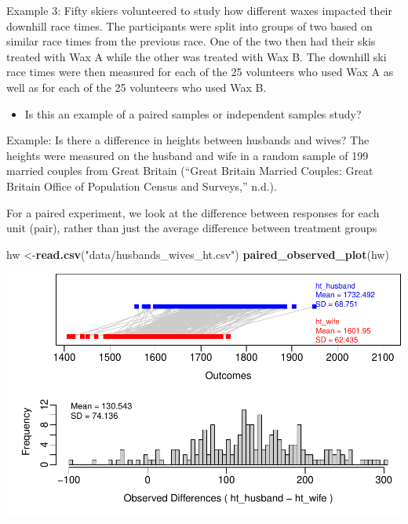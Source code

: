 \documentclass[
]{report}
\newenvironment{Shaded}{\begin{snugshade}}{\end{snugshade}}
\newcommand{\FunctionTok}[1]{\textcolor[rgb]{0.13,0.29,0.53}{\textbf{#1}}}
\newcommand{\NormalTok}[1]{#1}
\newcommand{\OtherTok}[1]{\textcolor[rgb]{0.56,0.35,0.01}{#1}}
\newcommand{\StringTok}[1]{\textcolor[rgb]{0.31,0.60,0.02}{#1}}
\providecommand{\tightlist}{%
  \setlength{\itemsep}{0pt}\setlength{\parskip}{0pt}}
\begin{document}
\vspace{0.3in}

Example 3: Fifty skiers volunteered to study how different waxes impacted their downhill race times. The participants were split into groups of two based on similar race times from the previous race. One of the two then had their skis treated with Wax A while the other was treated with Wax B. The downhill ski race times were then measured for each of the 25 volunteers who used Wax A as well as for each of the 25 volunteers who used Wax B.

\begin{itemize}
\tightlist
\item
  Is this an example of a paired samples or independent samples study?
\end{itemize}

\vspace{0.3in}

Example: Is there a difference in heights between husbands and wives? The heights were measured on the husband and wife in a random sample of 199 married couples from Great Britain ({``Great Britain Married Couples: Great Britain Office of Population Census and Surveys,''} n.d.).

For a paired experiment, we look at the difference between responses for each unit (pair), rather than just the average difference between treatment groups

\begin{Shaded}
\begin{Highlighting}[]
\NormalTok{hw }\OtherTok{\textless{}{-}}\FunctionTok{read.csv}\NormalTok{(}\StringTok{"data/husbands\_wives\_ht.csv"}\NormalTok{)}
\FunctionTok{paired\_observed\_plot}\NormalTok{(hw)}
\end{Highlighting}
\end{Shaded}

\begin{center}\includegraphics[width=0.7\linewidth]{11-VN11-paired_files/figure-latex/unnamed-chunk-1-1} \end{center}
\end{document}
